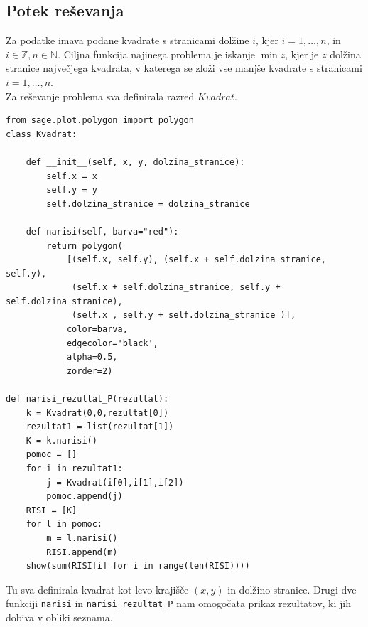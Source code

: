 \documentclass[a4paper, 11pt]{article}
\newcommand{\N}{\mathbb N}
\newcommand{\Z}{\mathbb Z}
\begin{document}
\subsection{Potek reševanja}
Za podatke imava podane kvadrate s stranicami dolžine $i$, kjer $i = 1, \dots , n$, in $ i \in \Z, n \in \N$.
Ciljna funkcija najinega problema je iskanje $\min z$, kjer je $z$ dolžina stranice največjega kvadrata, v katerega
se zloži vse manjše kvadrate s stranicami $i = 1, \dots , n$.\\
Za reševanje problema sva definirala razred $Kvadrat$.
\begin{verbatim}
from sage.plot.polygon import polygon
class Kvadrat:

    def __init__(self, x, y, dolzina_stranice):
        self.x = x
        self.y = y
        self.dolzina_stranice = dolzina_stranice

    def narisi(self, barva="red"):
        return polygon(
            [(self.x, self.y), (self.x + self.dolzina_stranice, self.y),
             (self.x + self.dolzina_stranice, self.y + self.dolzina_stranice),
             (self.x , self.y + self.dolzina_stranice )],
            color=barva,
            edgecolor='black',
            alpha=0.5,
            zorder=2)

def narisi_rezultat_P(rezultat):
    k = Kvadrat(0,0,rezultat[0])
    rezultat1 = list(rezultat[1])
    K = k.narisi()
    pomoc = []
    for i in rezultat1:
        j = Kvadrat(i[0],i[1],i[2])
        pomoc.append(j)
    RISI = [K]
    for l in pomoc:
        m = l.narisi()
        RISI.append(m)
    show(sum(RISI[i] for i in range(len(RISI))))
\end{verbatim}
Tu sva definirala kvadrat kot levo krajišče $(x,y)$ in dolžino stranice. Drugi dve funkciji
\texttt{narisi} in \verb|narisi_rezultat_P| nam omogočata prikaz rezultatov, ki jih dobiva v obliki seznama.
\end{document}
